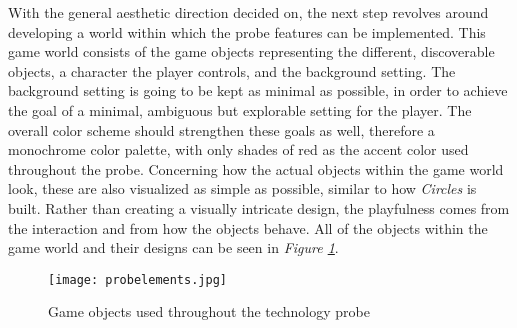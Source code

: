 With the general aesthetic direction decided on, the next step revolves around developing a world within which the probe features can be implemented. This game world consists of the game objects representing the different, discoverable objects, a character the player controls, and the background setting. The background setting is going to be kept as minimal as possible, in order to achieve the goal of a minimal, ambiguous but explorable setting for the player. The overall color scheme should strengthen these goals as well, therefore a monochrome color palette, with only shades of red as the accent color used throughout the probe. Concerning how the actual objects within the game world look, these are also visualized as simple as possible, similar to how \textit{Circles} \cite{circles2017} is built. Rather than creating a visually intricate design, the playfulness comes from the interaction and from how the objects behave. All of the objects within the game world and their designs can be seen in \textit{Figure \ref{fig:probeobjects}}.

\begin{figure}[h]
  \centering
  \texttt{[image: probelements.jpg]}
  \caption{Game objects used throughout the technology probe}
  \label{fig:probeobjects}
\end{figure}

